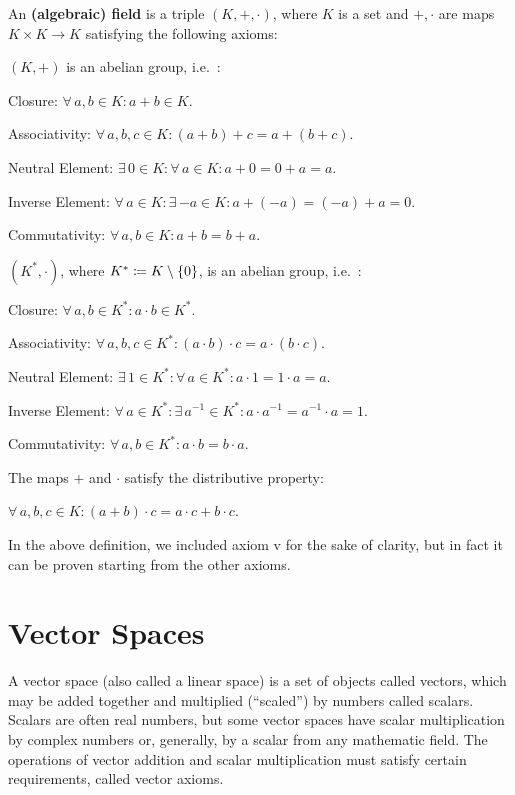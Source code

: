 \bd [Field]
An \textbf{(algebraic) field} is a triple $(K,+, \cdot)$, where $K$ is a set and $+,\cdot$ are maps $K\times K \to K$
satisfying the following axioms:
\bit
\item $(K,+)$ is an abelian group, i.e.\ :
\ben
\item[i)] Closure: $\forall \, a,b \in K : a + b \in K$.
\item[ii)] Associativity: $\forall \, a,b,c \in K : (a+b)+c=a+(b+c)$.
\item[iii)] Neutral Element: $\exists \, 0 \in K : \forall \, a \in K : a+0=0+a=a$.
\item[iv)] Inverse Element: $\forall \, a \in K : \exists \, {-a} \in K : a+(-a)=(-a)+a=0$.
\item[v)] Commutativity: $\forall \, a,b \in K : a+b=b+a$.
\een

\item $(K^*,\cdot)$, where $K^* \coloneqq K\setminus\{0\}$, is an abelian group, i.e.\ :
\ben
\item[vi)] Closure: $\forall \, a,b \in K^* : a \cdot b \in K^*$.
\item[vii)] Associativity: $\forall \, a,b,c \in K^* : (a\cdot b)\cdot c=a\cdot (b\cdot c)$.
\item[viii)] Neutral Element: $\exists \, 1 \in K^* : \forall \, a \in K^* : a\cdot 1=1\cdot a=a$.
\item[ix)] Inverse Element: $\forall \, a \in K^* : \exists \, a^{-1} \in K^* : a\cdot a^{-1}=a^{-1} \cdot a=1$.
\item[x)] Commutativity: $\forall \, a,b \in K^* : a\cdot b=b\cdot a$.
\een

\item The maps $+$ and $\cdot$ satisfy the distributive property:
\ben
\item[xi)] $\forall \, a,b,c \in K : (a+ b)\cdot c=a\cdot c + b\cdot c$.
\een
\eit
\ed

In the above definition, we included axiom v for the sake of clarity, but in fact it can be proven starting from the
other axioms.

\section{Vector Spaces}

A vector space (also called a linear space) is a set of objects called vectors, which may be added together and
multiplied (``scaled'') by numbers called scalars. Scalars are often real numbers, but some vector spaces have scalar
multiplication by complex numbers or, generally, by a scalar from any mathematic field. The operations of vector
addition and scalar multiplication must satisfy certain requirements, called vector axioms.

